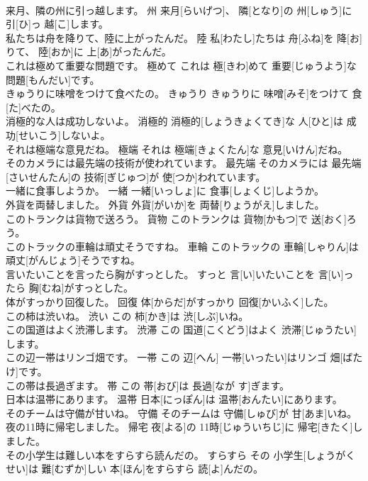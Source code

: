 \documentclass[8pt]{extreport}
\begin{document}
\begin{CJK}{UTF8}{min}
\\	来月、隣の州に引っ越します。	州	来月[らいげつ]、 隣[となり]の 州[しゅう]に 引[ひ]っ 越[こ]します。	
\\	私たちは舟を降りて、陸に上がったんだ。	陸	私[わたし]たちは 舟[ふね]を 降[お]りて、 陸[おか]に 上[あ]がったんだ。	
\\	これは極めて重要な問題です。	極めて	これは 極[きわ]めて 重要[じゅうよう]な 問題[もんだい]です。	
\\	きゅうりに味噌をつけて食べたの。	きゅうり	きゅうりに 味噌[みそ]をつけて 食[た]べたの。	
\\	消極的な人は成功しないよ。	消極的	消極的[しょうきょくてき]な 人[ひと]は 成功[せいこう]しないよ。	
\\	それは極端な意見だね。	極端	それは 極端[きょくたん]な 意見[いけん]だね。	
\\	そのカメラには最先端の技術が使われています。	最先端	そのカメラには 最先端[さいせんたん]の 技術[ぎじゅつ]が 使[つか]われています。	
\\	一緒に食事しようか。	一緒	一緒[いっしょ]に 食事[しょくじ]しようか。	
\\	外貨を両替しました。	外貨	外貨[がいか]を 両替[りょうがえ]しました。	
\\	このトランクは貨物で送ろう。	貨物	このトランクは 貨物[かもつ]で 送[おく]ろう。	
\\	このトラックの車輪は頑丈そうですね。	車輪	このトラックの 車輪[しゃりん]は 頑丈[がんじょう]そうですね。	
\\	言いたいことを言ったら胸がすっとした。	すっと	言[い]いたいことを 言[い]ったら 胸[むね]がすっとした。	
\\	体がすっかり回復した。	回復	体[からだ]がすっかり 回復[かいふく]した。	
\\	この柿は渋いね。	渋い	この 柿[かき]は 渋[しぶ]いね。	
\\	この国道はよく渋滞します。	渋滞	この 国道[こくどう]はよく 渋滞[じゅうたい]します。	
\\	この辺一帯はリンゴ畑です。	一帯	この 辺[へん] 一帯[いったい]はリンゴ 畑[ばたけ]です。	
\\	この帯は長過ぎます。	帯	この 帯[おび]は 長過[なが す]ぎます。	
\\	日本は温帯にあります。	温帯	日本[にっぽん]は 温帯[おんたい]にあります。	
\\	そのチームは守備が甘いね。	守備	そのチームは 守備[しゅび]が 甘[あま]いね。	
\\	夜の11時に帰宅しました。	帰宅	夜[よる]の 11時[じゅういちじ]に 帰宅[きたく]しました。	
\\	その小学生は難しい本をすらすら読んだの。	すらすら	その 小学生[しょうがくせい]は 難[むずか]しい 本[ほん]をすらすら 読[よ]んだの。	

\end{CJK}
\end{document}
